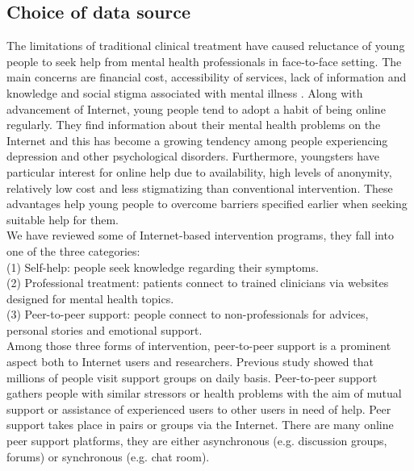 \subsection*{Choice of data source}
The limitations of traditional clinical treatment have caused reluctance of young people to seek help from mental health professionals in face-to-face setting. The main concerns are financial cost, accessibility of services, lack of information and knowledge and social stigma associated with mental illness \cite{Rickwood2005}. Along with advancement of Internet, young people tend to adopt a habit of being online regularly. They find information about their mental health problems on the Internet and this has become a growing tendency among people experiencing depression and other psychological disorders. Furthermore, youngsters have particular interest for online help due to availability, high levels of anonymity, relatively low cost and less stigmatizing than conventional intervention. These advantages help young people to overcome barriers specified earlier when seeking suitable help for them.\\
We have reviewed some of Internet-based intervention programs, they fall into one of the three categories: \\
(1) Self-help: people seek knowledge regarding their symptoms. \\
(2) Professional treatment: patients connect to trained clinicians via websites designed for mental health topics. \\
(3) Peer-to-peer support: people connect to non-professionals for advices, personal stories and emotional support.\\
Among those three forms of intervention, peer-to-peer support is a prominent aspect both to Internet users and researchers. Previous study showed that millions of people visit support groups on daily basis. Peer-to-peer support gathers people with similar stressors or health problems with the aim of mutual support or assistance of experienced users to other users in need of help. Peer support takes place in pairs or groups via the Internet. There are many online peer support platforms, they are either asynchronous (e.g. discussion groups, forums) or synchronous (e.g. chat room).\\
